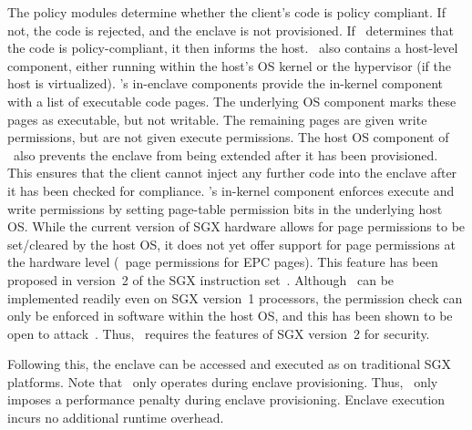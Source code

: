 The policy modules determine whether the client's code is policy compliant. If
not, the code is rejected, and the enclave is not provisioned. If \tool\
determines that the code is policy-compliant, it then informs the host. \tool\
also contains a host-level component, either running within the host's OS
kernel or the hypervisor (if the host is virtualized). \tool's in-enclave
components provide the in-kernel component with a list of executable code
pages. The underlying OS component marks these pages as executable, but not
writable. The remaining pages are given write permissions, but are not given
execute permissions. The host OS component of \tool\ also prevents the enclave
from being extended after it has been provisioned. This ensures that the client
cannot inject any further code into the enclave after it has been checked for
compliance. \tool's in-kernel component enforces execute and write permissions
by setting page-table permission bits in the underlying host OS. While the
current version of SGX hardware allows for page permissions to be set/cleared
by the host OS, it does not yet offer support for page permissions at the
hardware level (\ie~page permissions for EPC pages). This feature has been
proposed in version~2 of the SGX instruction set~\cite{sgx:v2:na}. Although
\tool\ can be implemented readily  even on SGX version~1 processors, the
permission check can only be enforced in software within the host OS, and this
has been shown to be open to attack~\cite{asyncshock:esorics16}. Thus, \tool\
requires the features of SGX version~2 for security.

Following this, the enclave can be accessed and executed as on traditional SGX
platforms. Note that \tool\ only operates during enclave provisioning. Thus,
\tool\ only imposes a performance penalty during enclave provisioning. Enclave
execution incurs no additional runtime overhead.

